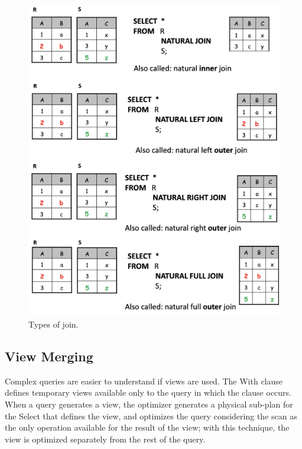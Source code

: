 \begin{figure}[h]
\centering
    \begin{minipage}{0.49\textwidth}
    \includegraphics[width=\linewidth]{img/joins1.png}
    \end{minipage} 
    \hfill
    \begin{minipage}{0.49\textwidth}
    \includegraphics[width=\linewidth]{img/joins2.png}
    \end{minipage}
    \caption{Types of join.}
    \label{fig:joins_in_out}
\end{figure}

\subsection{View Merging}

Complex queries are easier to understand if views are used. The With clause defines temporary views available only to the query in which the clause occurs. When a query generates a view, the optimizer generates a physical sub-plan for the Select that defines the view, and optimizes the query considering the scan as the only operation available for the result of the view; with this technique, the view is optimized separately from the rest of the query.

